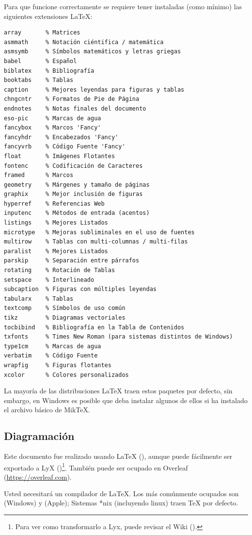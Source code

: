 Para que funcione correctamente se requiere tener instaladas (como mínimo) las siguientes extensiones \LaTeX{}:
\begin{Verbatim}[frame=lines, label=Paquetes requeridos por \inlinecode{thesis_utfsm.sty}
				, fontsize=\footnotesize
				, baselinestretch=1
				, formatcom=\color{gray}]
array       % Matrices
asmmath     % Notación ciéntifica / matemática
asmsymb     % Símbolos matemáticos y letras griegas
babel       % Español
biblatex    % Bibliografía
booktabs    % Tablas
caption     % Mejores leyendas para figuras y tablas
chngcntr    % Formatos de Pie de Página
endnotes    % Notas finales del documento
eso-pic     % Marcas de agua
fancybox    % Marcos 'Fancy'
fancyhdr    % Encabezados 'Fancy'
fancyvrb    % Código Fuente 'Fancy'
float       % Imágenes Flotantes
fontenc     % Codificación de Caracteres
framed      % Marcos
geometry    % Márgenes y tamaño de páginas
graphix     % Mejor inclusión de figuras
hyperref    % Referencias Web
inputenc    % Métodos de entrada (acentos)
listings    % Mejores Listados
microtype   % Mejoras subliminales en el uso de fuentes
multirow    % Tablas con multi-columnas / multi-filas
paralist    % Mejores Listados
parskip     % Separación entre párrafos
rotating    % Rotación de Tablas
setspace    % Interlineado
subcaption  % Figuras con múltiples leyendas
tabularx    % Tablas
textcomp    % Símbolos de uso común
tikz        % Diagramas vectoriales
tocbibind   % Bibliografía en la Tabla de Contenidos
txfonts     % Times New Roman (para sistemas distintos de Windows)
type1cm     % Marcas de agua
verbatim    % Código Fuente
wrapfig     % Figuras flotantes
xcolor      % Colores personalizados
\end{Verbatim}

La mayoría de las distribuciones \LaTeX{} traen estos paquetes por defecto, sin embargo, en Windows es posible que deba instalar algunos de ellos si ha instalado el archivo básico de MikTeX.


\subsection{Diagramación}
Este documento fue realizado usando \LaTeX{} (\citet{latex:whatis}), aunque puede fácilmente ser exportado a LyX (\citeauthor{lyx})\footnote{Para ver como transformarlo a Lyx, puede revisar el Wiki (\citeauthor{wikilyx}).}.
También puede ser ocupado en Overleaf (\hyperref[https://overleaf.com]{https://overleaf.com}).

Usted necesitará un compilador de \LaTeX. Los más comúnmente ocupados son \citeauthor{miktex} (Windows) y \citeauthor{mactex} (Apple); Sistemas *nix (incluyendo linux) traen \TeX{} por defecto.

